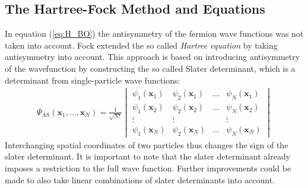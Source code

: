 \documentclass[twoside,        %
			   12pt,			%
               BCOR10mm,       %
               ngerman,english  %
               ]{scrartcl}
\begin{document}
\subsection{The Hartree-Fock Method and Equations}
In equation (\ref{eq:H_BO}) the antisymmetry of the fermion wave functions was not taken into account. Fock extended the so called \textit{Hartree equation} by taking antisymmetry into account. This approach is based on introducing antisymmetry of the wavefunction by constructing the so called Slater determinant, which is a determinant from single-particle wave functions:
\begin{align*}
\Psi_\text{AS}(\mathbf{x}_1, \dots, \mathbf{x}_N) = \frac{1}{\sqrt{N!}}
\begin{vmatrix}
\psi_1(\mathbf{x}_1) &\psi_2(\mathbf{x}_1)& \dots &\psi_N (\mathbf{x}_1) \\
\psi_1(\mathbf{x}_2) &\psi_2(\mathbf{x}_2)& \dots &\psi_N (\mathbf{x}_2) \\
\vdots & \vdots & & \vdots \\
\psi_1(\mathbf{x}_N)& \psi_2(\mathbf{x}_N)& \dots& \psi_N (\mathbf{x}_N)
\end{vmatrix}
\end{align*} 
Interchanging spatial coordinates of two particles thus changes the sign of the slater determinant. It is important to note that the slater determinant already imposes a restriction to the full wave function. Further improvements could be made to also take linear combinations of slater determinants into account.
\end{document}
